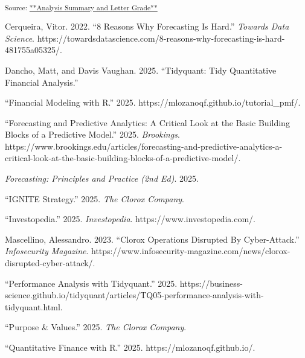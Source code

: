 \documentclass[
  letterpaper,
  DIV=11,
  numbers=noendperiod]{scrartcl}
\newlength{\cslhangindent}
\newenvironment{CSLReferences}[2] %
 {\begin{list}{}{%
  \setlength{\itemindent}{0pt}
  \setlength{\leftmargin}{0pt}
  \setlength{\parsep}{0pt}
  \ifodd #1
   \setlength{\leftmargin}{\cslhangindent}
   \setlength{\itemindent}{-1\cslhangindent}
  \fi
  \setlength{\itemsep}{#2\baselineskip}}}
 {\end{list}}
\begin{document}
\textsubscript{Source:
\href{https://ds-an.github.io/computational-finance-project/documents/summary-preview.html\#f4e056d6-fa5d-4eb2-93af-a70330a65e0d}{**Analysis
Summary and Letter Grade**}}

\label{refs}
\begin{CSLReferences}{1}{0}
Cerqueira, Vitor. 2022. {``8 {Reasons Why Forecasting Is Hard}.''}
\emph{Towards Data Science}.
https://towardsdatascience.com/8-reasons-why-forecasting-is-hard-481755a05325/.

Dancho, Matt, and Davis Vaughan. 2025. {``Tidyquant: {Tidy Quantitative
Financial Analysis}.''}

{``Financial Modeling with {R}.''} 2025.
https://mlozanoqf.github.io/tutorial\_pmf/.

{``Forecasting and Predictive Analytics: {A} Critical Look at the Basic
Building Blocks of a Predictive Model.''} 2025. \emph{Brookings}.
https://www.brookings.edu/articles/forecasting-and-predictive-analytics-a-critical-look-at-the-basic-building-blocks-of-a-predictive-model/.

\emph{Forecasting: {Principles} and {Practice} (2nd Ed)}. 2025.

{``{IGNITE Strategy}.''} 2025. \emph{The Clorox Company}.

{``Investopedia.''} 2025. \emph{Investopedia}.
https://www.investopedia.com/.

Mascellino, Alessandro. 2023. {``Clorox {Operations Disrupted By
Cyber-Attack}.''} \emph{Infosecurity Magazine}.
https://www.infosecurity-magazine.com/news/clorox-disrupted-cyber-attack/.

{``Performance {Analysis} with Tidyquant.''} 2025.
https://business-science.github.io/tidyquant/articles/TQ05-performance-analysis-with-tidyquant.html.

{``Purpose \& {Values}.''} 2025. \emph{The Clorox Company}.

{``Quantitative Finance with {R}.''} 2025. https://mlozanoqf.github.io/.


\end{CSLReferences}
\end{document}
